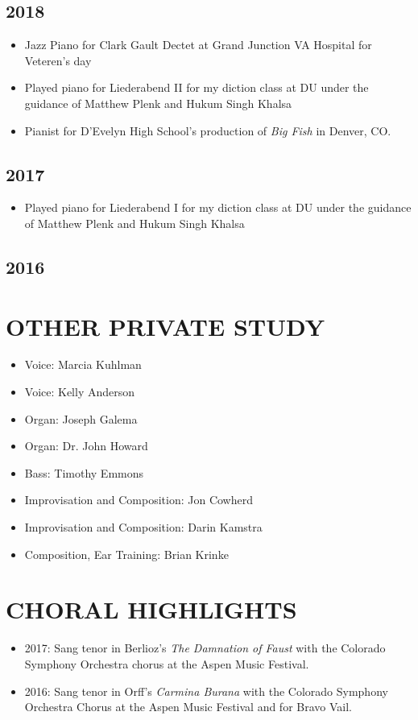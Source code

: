 \documentclass{article}
\newcommand{\cvItem}[1]{
        \item {
            {#1}
        }
    }
\newcommand{\cvItemListStart}{\begin{itemize}[leftmargin=10pt]}
\newcommand{\cvItemListEnd}{\end{itemize}}
\begin{document}
        \subsection{2018}
            \cvItemListStart
                \cvItem{Jazz Piano for Clark Gault Dectet at Grand Junction VA Hospital for
                Veteren's day}
                \cvItem{Played piano for Liederabend II for my diction class at DU under the guidance
                of Matthew Plenk and Hukum Singh Khalsa}
                \cvItem{Pianist for D'Evelyn High School's production of {\em Big Fish} in Denver, CO.}
            \cvItemListEnd
        \subsection{2017}
            \cvItemListStart
                \cvItem{Played piano for Liederabend I for my diction class at DU under the guidance
                of Matthew Plenk and Hukum Singh Khalsa}
            \cvItemListEnd
        \subsection{2016}

    \section{OTHER PRIVATE STUDY}
        \cvItemListStart
            \cvItem{Voice: Marcia Kuhlman}
            \cvItem{Voice: Kelly Anderson}
            \cvItem{Organ: Joseph Galema}
            \cvItem{Organ: Dr. John Howard}
            \cvItem{Bass: Timothy Emmons}
            \cvItem{Improvisation and Composition: Jon Cowherd}
            \cvItem{Improvisation and Composition: Darin Kamstra}
            \cvItem{Composition, Ear Training: Brian Krinke}
        \cvItemListEnd
    \section{CHORAL HIGHLIGHTS}
       \cvItemListStart
           \cvItem{2017: Sang tenor in Berlioz's {\em The Damnation of Faust} with the Colorado
           Symphony Orchestra chorus at the Aspen Music Festival.}
           \cvItem{2016: Sang tenor in Orff's {\em Carmina Burana} with the Colorado Symphony
           Orchestra Chorus at the Aspen Music Festival and for Bravo Vail.}
        \cvItemListEnd
\end{document}
